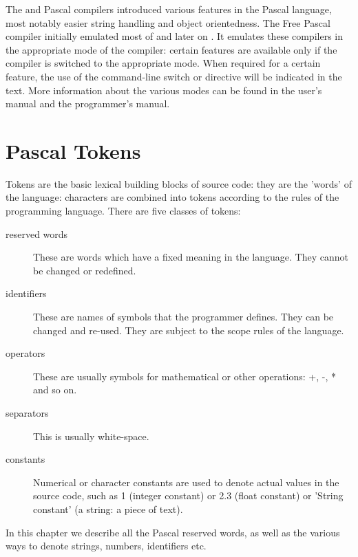 The \tp and \delphi Pascal compilers introduced various features in the 
Pascal language, most notably easier string handling and object orientedness. 
The Free Pascal compiler initially emulated most of \tp and later on
\delphi. It emulates these compilers in the appropriate mode of the compiler: 
certain features are available only if the compiler is switched to the appropriate 
mode. When required for a certain feature, the use of the  command-line 
switch or  directive will be indicated in the text. More information
about the various modes can be found in the user's manual and the
programmer's manual.


\chapter{Pascal Tokens}
Tokens are the basic lexical building blocks of source code: they are the
'words' of the language: characters are combined into tokens according to 
the rules of the programming language. There are five classes of tokens:
\begin{description}
\item[reserved words] These are words which have a fixed meaning in the
language. They cannot be changed or redefined.
\item[identifiers] These are names of symbols that the programmer defines.
They can be changed and re-used. They are subject to the scope rules of the
language.
\item[operators] These are usually symbols for mathematical or other
operations: +, -, * and so on.
\item[separators] This is usually white-space.
\item[constants] Numerical or character constants are used to denote actual
values in the source code, such as 1 (integer constant) or 2.3 (float
constant) or 'String constant' (a string: a piece of text).
\end{description}

In this chapter we describe all the Pascal reserved words, as well as the
various ways to denote strings, numbers, identifiers etc.

